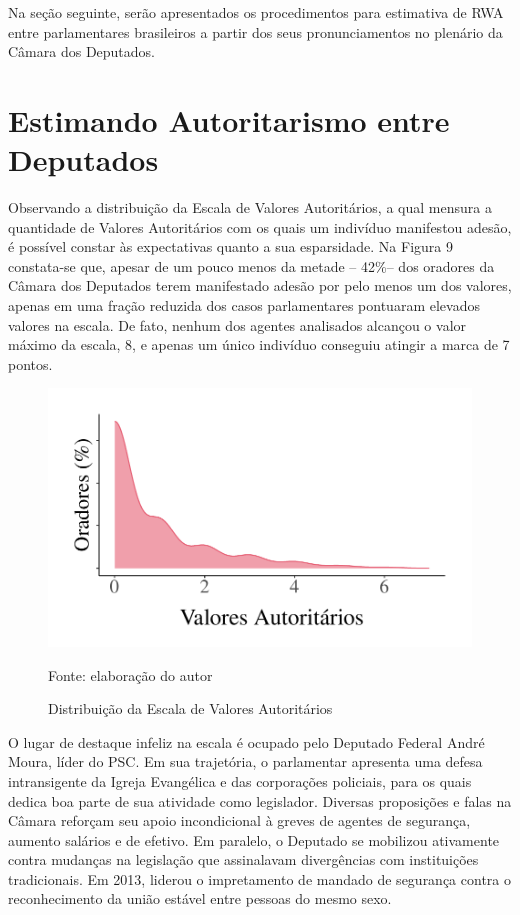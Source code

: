 \documentclass[
12pt,				%
openright,			%
twoside,			%
a4paper,			%
english,			%
french,				%
spanish,			%
brazil				%
]{abntex2}
\begin{document}
Na seção seguinte, serão apresentados os procedimentos para estimativa de RWA entre parlamentares brasileiros a partir dos seus pronunciamentos no plenário da Câmara dos Deputados.

\section{Estimando Autoritarismo entre Deputados}

Observando a distribuição da Escala de Valores Autoritários, a qual mensura a quantidade de Valores Autoritários com os quais um indivíduo manifestou adesão, é possível constar às expectativas quanto a sua esparsidade. Na Figura 9 constata-se que, apesar de um pouco menos da metade -- 42{\%}-- dos oradores da Câmara dos Deputados terem manifestado adesão por pelo menos um dos valores, apenas em uma fração reduzida dos casos parlamentares pontuaram elevados valores na escala. De fato, nenhum dos agentes analisados alcançou o valor máximo da escala, 8, e apenas um único indivíduo conseguiu atingir a marca de 7 pontos.

\begin{figure}[h]
	\caption{Distribuição da Escala de Valores Autoritários}
	\label{fig:scale_auth_val}
	\centering
	\includegraphics[width=.6\linewidth]{figures/scale_auth_val}
	
	Fonte: elaboração do autor	
\end{figure}

O lugar de destaque infeliz na escala é ocupado pelo Deputado Federal André Moura, líder do PSC. Em sua trajetória, o parlamentar apresenta uma defesa intransigente da Igreja Evangélica e das corporações policiais, para os quais dedica boa parte de sua atividade como legislador. Diversas proposições e falas na Câmara reforçam seu apoio incondicional à greves de agentes de segurança, aumento salários e de efetivo. Em paralelo, o Deputado se mobilizou ativamente contra mudanças na legislação que assinalavam divergências com instituições tradicionais. Em 2013, liderou o impretamento de mandado de segurança contra o reconhecimento da união estável entre pessoas do mesmo sexo.  	 
\end{document}
